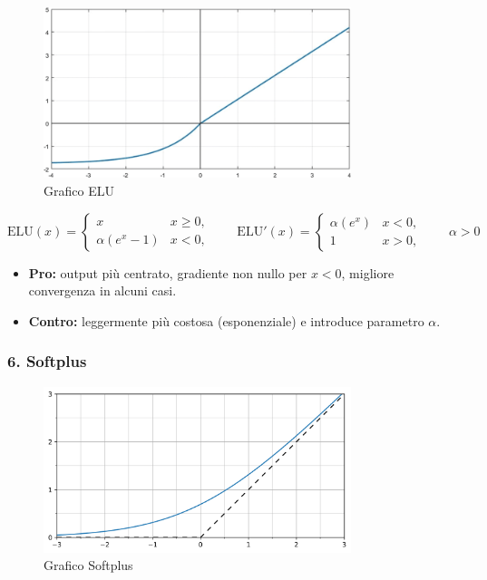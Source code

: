 \documentclass[a4paper,12pt]{report}
\begin{document}
	\begin{figure}[H]
		\centering
		\includegraphics[width=0.8\textwidth]{img/elu.png}
		\caption{Grafico ELU}
	\end{figure}
	
	\[
	\mathrm{ELU}(x)=\begin{cases}x & x\ge0,\\ \alpha(e^x-1) & x<0,\end{cases}\qquad
	\mathrm{ELU}'(x)=\begin{cases}\alpha(e^x) & x<0,\\ 1 & x>0,\end{cases}\qquad \alpha>0
	\]
	\begin{itemize}
		\item \textbf{Pro:} output più centrato, gradiente non nullo per $x<0$, migliore convergenza in alcuni casi.
		\item \textbf{Contro:} leggermente più costosa (esponenziale) e introduce parametro $\alpha$.
	\end{itemize}
	
	\subsubsection{6. Softplus}
	
	\begin{figure}[H]
		\centering
		\includegraphics[width=0.8\textwidth]{img/softplus.png}
		\caption{Grafico Softplus}
	\end{figure}
	
\end{document}
